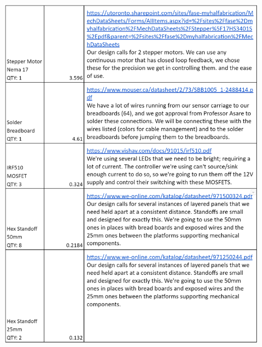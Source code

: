 \documentclass[12pt]{article}
\begin{document}
        \includegraphics[width=\linewidth]{BOMpg2.png}

        \newpage
\end{document}
